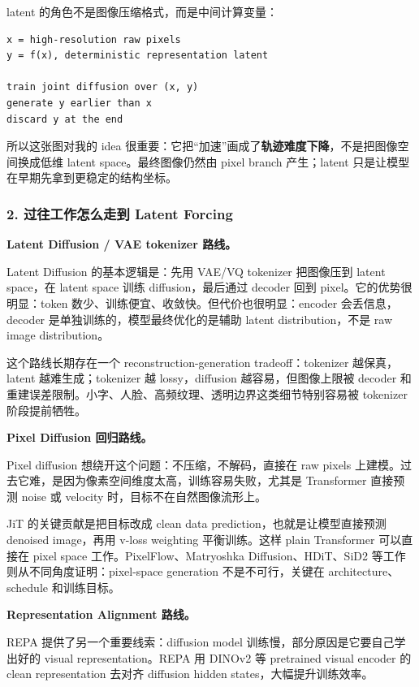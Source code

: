 latent 的角色不是图像压缩格式，而是中间计算变量：
\begin{lstlisting}[language={},basicstyle=\ttfamily\small]
x = high-resolution raw pixels
y = f(x), deterministic representation latent

train joint diffusion over (x, y)
generate y earlier than x
discard y at the end
\end{lstlisting}

所以这张图对我的 idea 很重要：它把“加速”画成了\textbf{轨迹难度下降}，不是把图像空间换成低维 latent space。最终图像仍然由 pixel branch 产生；latent 只是让模型在早期先拿到更稳定的结构坐标。

\subsubsection*{2. 过往工作怎么走到 Latent Forcing}

\textbf{Latent Diffusion / VAE tokenizer 路线。}

Latent Diffusion 的基本逻辑是：先用 VAE/VQ tokenizer 把图像压到 latent space，在 latent space 训练 diffusion，最后通过 decoder 回到 pixel。它的优势很明显：token 数少、训练便宜、收敛快。但代价也很明显：encoder 会丢信息，decoder 是单独训练的，模型最终优化的是辅助 latent distribution，不是 raw image distribution。

这个路线长期存在一个 reconstruction-generation tradeoff：tokenizer 越保真，latent 越难生成；tokenizer 越 lossy，diffusion 越容易，但图像上限被 decoder 和重建误差限制。小字、人脸、高频纹理、透明边界这类细节特别容易被 tokenizer 阶段提前牺牲。

\textbf{Pixel Diffusion 回归路线。}

Pixel diffusion 想绕开这个问题：不压缩，不解码，直接在 raw pixels 上建模。过去它难，是因为像素空间维度太高，训练容易失败，尤其是 Transformer 直接预测 noise 或 velocity 时，目标不在自然图像流形上。

JiT 的关键贡献是把目标改成 clean data prediction，也就是让模型直接预测 denoised image，再用 v-loss weighting 平衡训练。这样 plain Transformer 可以直接在 pixel space 工作。PixelFlow、Matryoshka Diffusion、HDiT、SiD2 等工作则从不同角度证明：pixel-space generation 不是不可行，关键在 architecture、schedule 和训练目标。

\textbf{Representation Alignment 路线。}

REPA 提供了另一个重要线索：diffusion model 训练慢，部分原因是它要自己学出好的 visual representation。REPA 用 DINOv2 等 pretrained visual encoder 的 clean representation 去对齐 diffusion hidden states，大幅提升训练效率。

